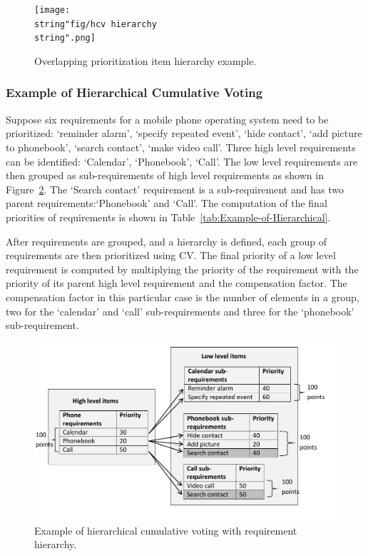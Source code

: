 \begin{figure}
	\center
\texttt{[image: \\string"fig/hcv hierarchy\\string".png]}
\caption{\label{fig:Overlapping-Prioritization-Item}Overlapping prioritization item hierarchy example.}
\end{figure}

\subsubsection{Example of Hierarchical Cumulative Voting}
Suppose six requirements
for a mobile phone operating system need to be prioritized: `reminder
alarm', `specify repeated event', `hide contact', `add picture to phonebook',
`search contact', `make video call'. Three high level requirements can
be identified: `Calendar', `Phonebook', `Call'. The low level requirements are then
grouped as sub-requirements of high level requirements as shown in
Figure~\ref{fig:Example-of-Hierachical}. The `Search contact' requirement is a 
sub-requirement and has two parent requirements:`Phonebook'
and `Call'. The computation of the final priorities of requirements is shown
in Table~\ref{tab:Example-of-Hierarchical}.

After requirements are grouped, and a hierarchy is defined, each group
of requirements are then prioritized using CV. The final priority of a low level
requirement is computed by multiplying the priority of the requirement
with the priority of its parent high level requirement and the compensation
factor. The compensation factor in this particular case is the number of elements
in a group, two for the `calendar' and `call' sub-requirements and three for
the `phonebook' sub-requirement.

\begin{flushleft}
\begin{figure}
\center
\includegraphics[scale=0.5]{fig/hcv2}

\caption{\label{fig:Example-of-Hierachical}Example of hierarchical cumulative voting with requirement hierarchy.}
\end{figure}

\par\end{flushleft}

